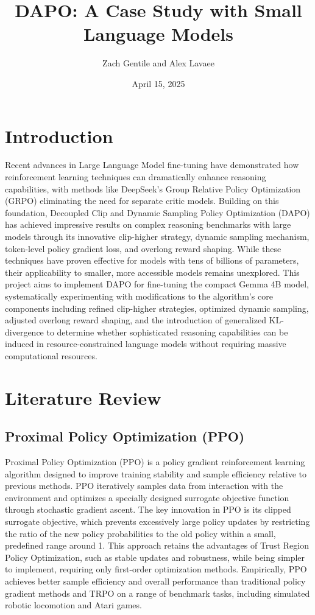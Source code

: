 \documentclass[11pt, oneside]{article}   	%
\title{DAPO: A Case Study with Small Language Models}
\author{Zach Gentile and Alex Lavaee}
\date{April 15, 2025}
\begin{document}
\maketitle

\section*{Introduction}

Recent advances in Large Language Model fine-tuning have demonstrated how reinforcement learning techniques can dramatically enhance reasoning capabilities, with methods like DeepSeek's Group Relative Policy Optimization (GRPO) eliminating the need for separate critic models. Building on this foundation, Decoupled Clip and Dynamic Sampling Policy Optimization (DAPO) has achieved impressive results on complex reasoning benchmarks with large models through its innovative clip-higher strategy, dynamic sampling mechanism, token-level policy gradient loss, and overlong reward shaping. While these techniques have proven effective for models with tens of billions of parameters, their applicability to smaller, more accessible models remains unexplored. This project aims to implement DAPO for fine-tuning the compact Gemma 4B model, systematically experimenting with modifications to the algorithm's core components including refined clip-higher strategies, optimized dynamic sampling, adjusted overlong reward shaping, and the introduction of generalized KL-divergence to determine whether sophisticated reasoning capabilities can be induced in resource-constrained language models without requiring massive computational resources.

\section*{Literature Review}

\subsection*{Proximal Policy Optimization (PPO) \cite{schulman2017proximalpolicyoptimizationalgorithms}}

Proximal Policy Optimization (PPO) is a policy gradient reinforcement learning algorithm designed to improve training stability and sample efficiency relative to previous methods. PPO iteratively samples data from interaction with the environment and optimizes a specially designed surrogate objective function through stochastic gradient ascent. The key innovation in PPO is its clipped surrogate objective, which prevents excessively large policy updates by restricting the ratio of the new policy probabilities to the old policy within a small, predefined range around 1. This approach retains the advantages of Trust Region Policy Optimization, such as stable updates and robustness, while being simpler to implement, requiring only first-order optimization methods. Empirically, PPO achieves better sample efficiency and overall performance than traditional policy gradient methods and TRPO on a range of benchmark tasks, including simulated robotic locomotion and Atari games.
\end{document}
